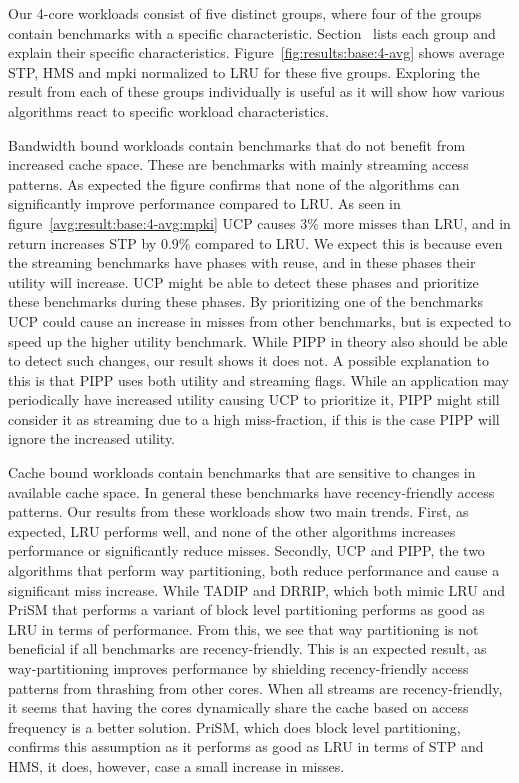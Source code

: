 Our 4-core workloads consist of five distinct groups, where four of the groups contain benchmarks with a specific characteristic.
Section~ lists each group and explain their specific characteristics.
Figure~\ref{fig:results:base:4-avg} shows average STP, HMS and mpki normalized to LRU for these five groups.
Exploring the result from each of these groups individually is useful as it will show how various algorithms react to specific workload characteristics.

Bandwidth bound workloads contain benchmarks that do not benefit from increased cache space.
These are benchmarks with mainly streaming access patterns. 
As expected the figure confirms that none of the algorithms can significantly improve performance compared to LRU.
As seen in figure~\ref{avg:result:base:4-avg:mpki} UCP causes 3\% more misses than LRU, and in return increases STP by 0.9\% compared to LRU.
We expect this is because even the streaming benchmarks have phases with reuse, and in these phases their utility will increase.
UCP might be able to detect these phases and prioritize these benchmarks during these phases.
By prioritizing one of the benchmarks UCP could cause an increase in misses from other benchmarks, but is expected to speed up the higher utility benchmark.
While PIPP in theory also should be able to detect such changes, our result shows it does not.
A possible explanation to this is that PIPP uses both utility and streaming flags.
While an application may periodically have increased utility causing UCP to prioritize it, PIPP might still consider it as streaming due to a high miss-fraction, if this is the case PIPP will ignore the increased utility.

Cache bound workloads contain benchmarks that are sensitive to changes in available cache space.
In general these benchmarks have recency-friendly access patterns.
Our results from these workloads show two main trends.
First, as expected, LRU performs well, and none of the other algorithms increases performance or significantly reduce misses.
Secondly, UCP and PIPP, the two algorithms that perform way partitioning, both reduce performance and cause a significant miss increase. 
While TADIP and DRRIP, which both mimic LRU and PriSM that performs a variant of block level partitioning performs as good as LRU in terms of performance.
From this, we see that way partitioning is not beneficial if all benchmarks are recency-friendly.
This is an expected result, as way-partitioning improves performance by shielding recency-friendly access patterns from thrashing from other cores.
When all streams are recency-friendly, it seems that having the cores dynamically share the cache based on access frequency is a better solution.
PriSM, which does block level partitioning, confirms this assumption as it performs as good as LRU in terms of STP and HMS, it does, however, case a small increase in misses.

